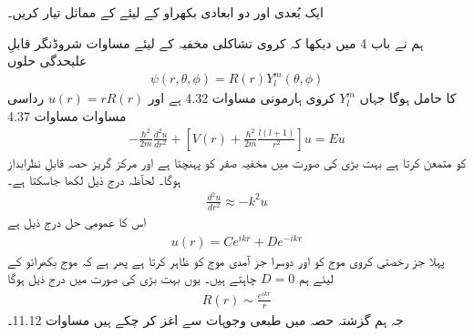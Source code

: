 ایک بُعدی اور دو ابعادی بکھراو کے لیئے  کے مماثل تیار کریں۔




ہم نے باب 4 میں دیکھا کہ کروی تشاکلی مخفیہ  کے لیئے مساوات شروڈنگر قابلِ علیحدگی حلوں
\begin{align}
	\psi(r, \theta, \phi) = R(r)Y^m_l(\theta, \phi)
\end{align}
کا حامل ہوگا جہاں \(Y_l^m\) کروی ہارمونی مساوات \num{4.32} ہے اور \(u(r) = rR(r)\) رداسی مساوات مساوات \num{4.37} 
\begin{align}
	-\frac{\hbar^2}{2m}\frac{d^2u}{dr^2}+\left[V(r)+\frac{\hbar^2}{2m}\frac{l(l+1)}{r^2}\right]u = Eu
\end{align}
کو متمعن کرتا ہے بہت بڑی  کی صورت میں مخفیہ صفر کو پہنچتا ہے اور مرکز گریز حصہ قابلِ نظرابداز ہوگا۔ لحآظہ درج ذیل لکھا جاسکتا ہے۔
\begin{align*}
	\frac{d^2u}{dr^2} \approx-k^2u
\end{align*}
اس کا عمومی حل درج ذیل ہے
\begin{align*}
	u(r) = Ce^{ikr}+De^{-ikr}
\end{align*}
پہلا جز رخصتی کروی موج کو اور دوسرا جز آمدی موج کو ظاہر کرتا ہے پھر ہے کہ موج  بکھرائو کے لیئے ہم \(D=0\) چاہتے ہیں۔ یوں بہت بڑی  کی صورت میں درج ذیل ہوگا
\begin{align*}
	R(r)\sim\frac{e^{ikr}}{r}
\end{align*}
جہ ہم گزشتہ حصہ میں طبعی وجوہات سے اغز کر چکے ہیں مساوات  \num{11.12}۔

